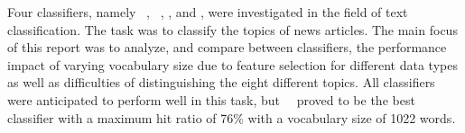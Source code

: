 \noindent Four classifiers, namely \bn\ \nb, \mn\ \nb, \rf, and \svm, were investigated in the field of text classification. The task was to classify the topics of news articles. The main focus of this report was to analyze, and compare between classifiers, the performance impact of varying vocabulary size due to feature selection for different data types as well as difficulties of distinguishing the eight different topics. All classifiers were anticipated to perform well in this task, but \mn\ \nb\ proved to be the best classifier with a maximum hit ratio of 76\% with a vocabulary size of 1022 words.